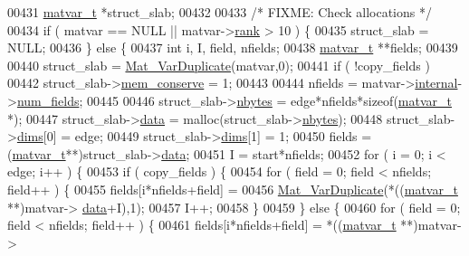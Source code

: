 \begin{DoxyCode}
00431     \hyperlink{group___m_a_t_structmatvar__t}{matvar\_t} *struct\_slab;
00432 
00433     \textcolor{comment}{/* FIXME: Check allocations */}
00434     \textcolor{keywordflow}{if} ( matvar == NULL || matvar->\hyperlink{group___m_a_t_a84ba70c96ded13cc555fa75b768d9921}{rank} > 10 ) \{
00435        struct\_slab = NULL;
00436     \} \textcolor{keywordflow}{else} \{
00437         \textcolor{keywordtype}{int} i, I, field, nfields;
00438         \hyperlink{group___m_a_t_structmatvar__t}{matvar\_t} **fields;
00439 
00440         struct\_slab = \hyperlink{group___m_a_t_ga7ef80c5d99d7918b2b09db3bea106ecc}{Mat\_VarDuplicate}(matvar,0);
00441         \textcolor{keywordflow}{if} ( !copy\_fields )
00442             struct\_slab->\hyperlink{group___m_a_t_aff20e87a00691c97340ab07656a13ee7}{mem\_conserve} = 1;
00443 
00444         nfields = matvar->\hyperlink{group___m_a_t_a6e97e3ed9f40c49322c18561c2a94e92}{internal}->\hyperlink{structmatvar__internal_a93fc447484f455eddf9334f2e9e411c2}{num\_fields};
00445 
00446         struct\_slab->\hyperlink{group___m_a_t_abf1c844540503be2df9bb3db93cfe307}{nbytes} = edge*nfields*\textcolor{keyword}{sizeof}(\hyperlink{group___m_a_t_structmatvar__t}{matvar\_t} *);
00447         struct\_slab->\hyperlink{group___m_a_t_a5672978efa230bbdecdf38ede781f7fa}{data} = malloc(struct\_slab->\hyperlink{group___m_a_t_abf1c844540503be2df9bb3db93cfe307}{nbytes});
00448         struct\_slab->\hyperlink{group___m_a_t_a8e01234e1c862ce3472bb37f5a09b92c}{dims}[0] = edge;
00449         struct\_slab->\hyperlink{group___m_a_t_a8e01234e1c862ce3472bb37f5a09b92c}{dims}[1] = 1;
00450         fields = (\hyperlink{group___m_a_t_structmatvar__t}{matvar\_t}**)struct\_slab->\hyperlink{group___m_a_t_a5672978efa230bbdecdf38ede781f7fa}{data};
00451         I = start*nfields;
00452         for ( i = 0; i < edge; i++ ) \{
00453             \textcolor{keywordflow}{if} ( copy\_fields ) \{
00454                 \textcolor{keywordflow}{for} ( field = 0; field < nfields; field++ ) \{
00455                     fields[i*nfields+field] =
00456                         \hyperlink{group___m_a_t_ga7ef80c5d99d7918b2b09db3bea106ecc}{Mat\_VarDuplicate}(*((\hyperlink{group___m_a_t_structmatvar__t}{matvar\_t} **)matvar->
      \hyperlink{group___m_a_t_a5672978efa230bbdecdf38ede781f7fa}{data}+I),1);
00457                     I++;
00458                 \}
00459             \} \textcolor{keywordflow}{else} \{
00460                 \textcolor{keywordflow}{for} ( field = 0; field < nfields; field++ ) \{
00461                     fields[i*nfields+field] = *((\hyperlink{group___m_a_t_structmatvar__t}{matvar\_t} **)matvar->

\end{DoxyCode}
